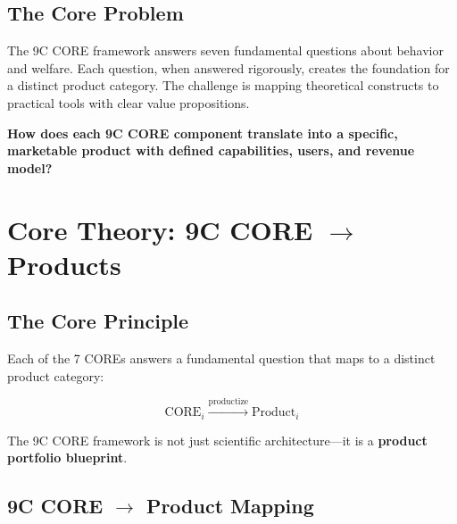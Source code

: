 \subsection{The Core Problem}

The 9C CORE framework answers seven fundamental questions about behavior and welfare. Each question, when answered rigorously, creates the foundation for a distinct product category. The challenge is mapping theoretical constructs to practical tools with clear value propositions.

\begin{tcolorbox}[colback=red!5!white, colframe=red!75!black,
    title=The Fundamental Question]
\textbf{How does each 9C CORE component translate into a specific, marketable product with defined capabilities, users, and revenue model?}
\end{tcolorbox}


\section{Core Theory: 9C CORE $\to$ Products}
\label{sec:vvv3-theory}

\subsection{The Core Principle}

Each of the 7 COREs answers a fundamental question that maps to a distinct product category:

\begin{equation}
\text{CORE}_i \xrightarrow{\text{productize}} \text{Product}_i
\end{equation}

The 9C CORE framework is not just scientific architecture---it is a \textbf{product portfolio blueprint}.


\subsection{9C CORE $\to$ Product Mapping}

